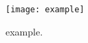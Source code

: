 \documentclass[aps,prl,twocolumn]{revtex4-1}
\begin{document}
\begin{figure}
  \centering
  \texttt{[image: example]}
  \caption{example.}
  \label{fig:ex}
\end{figure}

\lipsum
\end{document}
